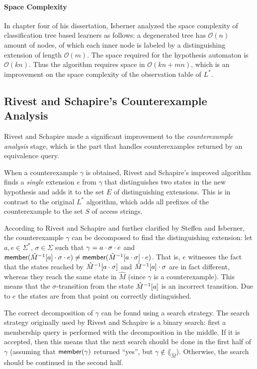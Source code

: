 \documentclass[multi,crop=false,class=article]{standalone}
\begin{document}
\paragraph{Space Complexity} In chapter four of his dissertation, Isberner
analyzed the space complexity of classification tree based learners as follows:
a degenerated tree has $\mathcal{O}(n)$ amount of nodes, of which each inner
node is labeled by a distinguishing extension of length
$\mathcal{O}(m)$\cite{Isberner2015a}. The space required for the hypothesis
automaton is $\mathcal{O}(kn)$\cite{Isberner2015a}. Thus the algorithm requires
space in $\mathcal{O}(kn + mn)$\cite{Isberner2014b,Isberner2015a}, which is an
improvement on the space complexity of the observation table of $L^*$.

\subsection{Rivest and Schapire's Counterexample Analysis}
\label{sec:rivest-schap-count}
Rivest and Schapire made a significant improvement\cite{Rivest1993} to the
\textit{counterexample analysis} stage, which is the part that handles
counterexamples returned by an equivalence query.

When a counterexample $\gamma$ is obtained, Rivest and Schapire's improved
algorithm finds a \textit{single} extension $e$ from $\gamma$ that distinguishes
two states in the new hypothesis and adds it to the set $E$ of distinguishing
extensions. This is in contrast to the original $L^*$ algorithm, which adds all
prefixes of the counterexample to the set $S$ of access strings.

According to Rivest and Schapire\cite{Rivest1993} and further clarified by
Steffen\cite{Steffen2011} and Isberner\cite{Isberner2014a}, the counterexample
$\gamma$ can be decomposed to find the distinguishing extension: let
$a, e \in \Sigma^*$, $\sigma \in \Sigma$ such that
$\gamma = a \cdot \sigma \cdot e$ and
$\mathsf{member}(\hat M^{-1}[a]\cdot\sigma\cdot e) \neq \mathsf{member}(\hat
  M^{-1}[a\cdot\sigma]\cdot e)$. That is, $e$ witnesses the fact that the states
reached by $\hat M^{-1}[a\cdot\sigma]$ and
$\hat M^{-1}[a]\cdot\sigma$ are in fact different, whereas they reach the
same state in $\hat M$ (since $\gamma$ is a counterexample). This means that the
$\sigma$-transition from the state $\hat M^{-1}[a]$ is an incorrect
transition. Due to $e$ the states are from that point on correctly
distinguished.

The correct decomposition of $\gamma$ can be found using a search strategy. The
search strategy originally used by Rivest and Schapire is a binary search: first
a membership query is performed with the decomposition in the middle. If it is
accepted, then this means that the next search should be done in the first half
of $\gamma$ (assuming that $\mathsf{member}(\gamma)$ returned ``yes'', but $\gamma
\not\in \lang_{\hat M}$). Otherwise, the search should be continued in the
second half.
\end{document}
